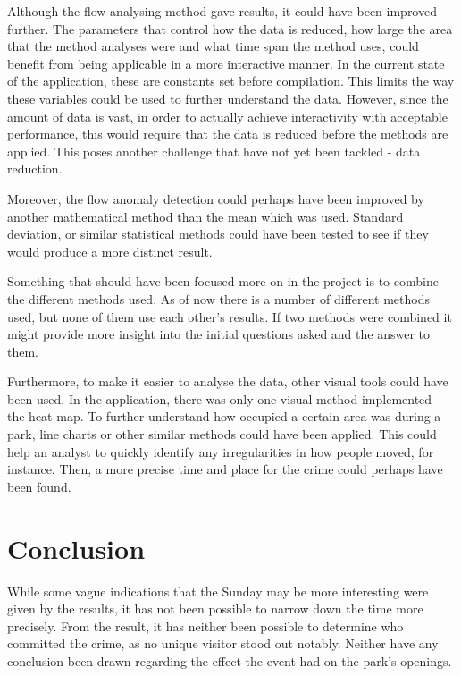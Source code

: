 \documentclass[journal]{vgtc}                %
\begin{document}
Although the flow analysing method gave results, it could have been improved further. The parameters that control how the data is reduced, how large the area that the method analyses were and what time span the method uses, could benefit from being applicable in a more interactive manner. In the current state of the application, these are constants set before compilation. This limits the way these variables could be used to further understand the data. However, since the amount of data is vast, in order to actually achieve interactivity with acceptable performance, this would require that the data is reduced before the methods are applied. This poses another challenge that have not yet been tackled - data reduction.

Moreover, the flow anomaly detection could perhaps have been improved by another mathematical method than the mean which was used. Standard deviation, or similar statistical methods could have been tested to see if they would produce a more distinct result.

Something that should have been focused more on in the project is to combine the different methods used. As of now there is a number of different methods used, but none of them use each other's results. If two methods were combined it might provide more insight into the initial questions asked and the answer to them.

Furthermore, to make it easier to analyse the data, other visual tools could have been used. In the application, there was only one visual method implemented – the heat map. To further understand how occupied a certain area was during a park, line charts or other similar methods could have been applied. This could help an analyst to quickly identify any irregularities in how people moved, for instance. Then, a more precise time and place for the crime could perhaps have been found.


\section{Conclusion}
While some vague indications that the Sunday may be more interesting were given by the results, it has not been possible to narrow down the time more precisely. From the result, it has neither been possible to determine who committed the crime, as no unique visitor stood out notably. Neither have any conclusion been drawn regarding the effect the event had on the park's openings.

\appendix
\onecolumn
\end{document}

